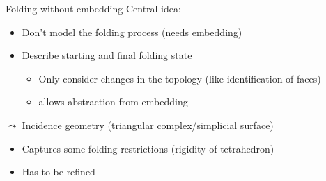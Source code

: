 \begin{frame}{Folding without embedding}
    \pause
    Central idea:
    \begin{itemize}
        \pause
        \item Don't model the folding process (needs embedding)
        \pause
        \item Describe starting and final folding state
            \begin{itemize}
                \pause
                \item Only consider changes in the topology
                    \pause (like identification of faces)
                \pause
                \item allows abstraction from embedding
            \end{itemize}
    \end{itemize}
    \hspace{10pt}

    \pause
    $\leadsto$ Incidence geometry (triangular complex/simplicial surface)

    \begin{itemize}
        \pause
        \item Captures some folding restrictions (rigidity of tetrahedron)
        \pause
        \item Has to be refined
    \end{itemize}
\end{frame}

\newcommand{\colFaceA}{\colorFaceA}
\newcommand{\colFaceB}{\colorFaceB}
\newcommand{\colFaceC}{\colorFaceC}


